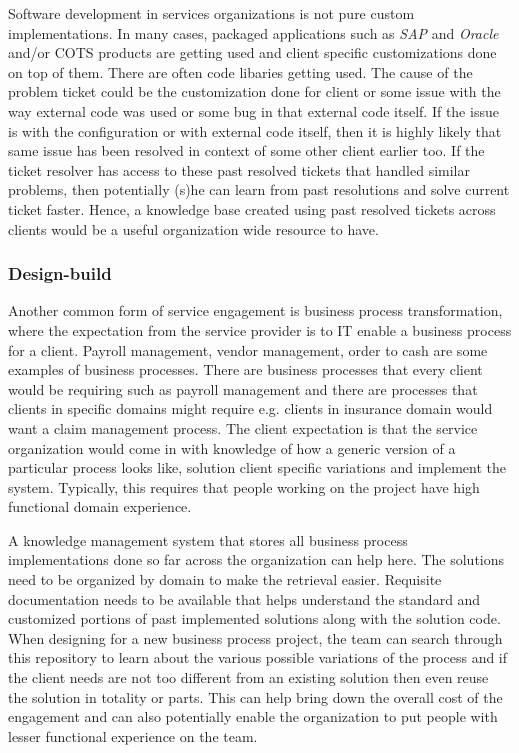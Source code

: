 Software development in services organizations is not pure custom implementations. In many cases, packaged applications such as \textit{SAP} and \textit{Oracle} and/or COTS products are getting used and client specific customizations done on top of them. There are often code libaries getting used.
The cause of the problem ticket could be the customization done for client or some issue with the way external code was used or some bug in that external code itself. If the issue is with the configuration or with external code itself, then it is highly likely that same issue has been resolved in context of some other client earlier too. If the ticket resolver has access to these past resolved tickets that handled similar problems, then potentially (s)he can learn from past resolutions and solve current ticket faster. Hence, a knowledge base created using past resolved tickets across clients would be a useful organization wide resource to have. 

\subsubsection{Design-build}

Another common form of service engagement is business process transformation, where the expectation from the service provider is to IT enable a business process for a client. Payroll management, vendor management, order to cash are some examples of business processes. There are business processes that every client would be requiring such as payroll management and there are processes that clients in specific domains might require e.g. clients in insurance domain would want a claim management process. The client expectation is that the service organization would come in with knowledge of how a generic version of a particular process looks like, solution client specific variations and implement the system. Typically, this requires that people working on the project have high functional domain experience. 

A knowledge management system that stores all business process implementations done so far across the organization can help here. The solutions need to be organized by domain to make the retrieval easier. Requisite documentation needs to be available that helps understand the standard and customized portions of past implemented solutions along with the solution code. When designing for a new business process project, the team can search through this repository to learn about the various possible variations of the process and if the client needs are not too different from an existing solution then even reuse the solution in totality or parts. This can help bring down the overall cost of the engagement and can also potentially enable the organization to put people with lesser functional experience on the team. 

